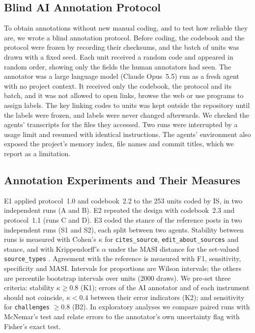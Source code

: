 \documentclass[10pt,a4paper]{article}
\newcommand{\kod}[1]{\texttt{#1}}
\begin{document}
\subsection{Blind AI Annotation Protocol}
To obtain annotations without new manual coding, and to test how reliable they are, we wrote a blind
annotation protocol. Before coding, the codebook and the protocol were frozen by recording their checksums,
and the batch of units was drawn with a fixed seed. Each unit received a random code and appeared in random
order, showing only the fields the human annotators had seen. The annotator was a large language model
(Claude Opus~5.5) run as a fresh agent with no project context. It received only the codebook, the protocol
and its batch, and it was not allowed to open links, browse the web or use programs to assign labels.
The key linking codes to units was kept outside the repository until the labels were frozen, and labels
were never changed afterwards. We checked the agents' transcripts for the files they accessed. Two runs
were interrupted by a usage limit and resumed with identical instructions. The agents' environment also
exposed the project's memory index, file names and commit titles, which we report as a limitation.

\subsection{Annotation Experiments and Their Measures}
E1 applied protocol~1.0 and codebook~2.2 to the 253 units coded by IS, in two independent runs (A and B).
E2 repeated the design with codebook~2.3 and protocol~1.1 (runs C and D). E3 coded the stance of the reference
posts in two independent runs (S1 and S2), each split between two agents. Stability between runs is
measured with Cohen's $\kappa$ for \kod{cites\_source}, \kod{edit\_about\_sources} and stance, and with
Krippendorff's $\alpha$ under the MASI distance for the set-valued \kod{source\_types}
\cite{cohen1960,krippendorff2004,passonneau2006}. Agreement with the reference is measured with F1,
sensitivity, specificity and MASI. Intervals for proportions are Wilson intervals; the others are
percentile bootstrap intervals over units (2000 draws). We pre-set three criteria: stability $\kappa \geq
0.8$ (K1); errors of the AI annotator and of each instrument should not coincide, $\kappa < 0.4$ between
their error indicators (K2); and sensitivity for \kod{challenges} $\geq 0.8$ (B2). In exploratory analyses
we compare paired runs with McNemar's test \cite{mcnemar1947} and relate errors to the annotator's own
uncertainty flag with Fisher's exact test.
\end{document}
